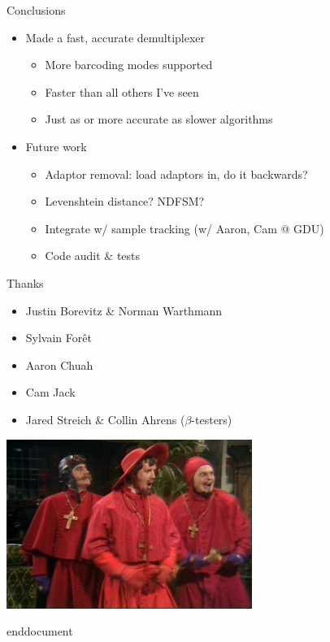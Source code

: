 \documentclass[t]{beamer}
\begin{document}
\begin{frame}{Conclusions}
  \begin{itemize}
    \item Made a fast, accurate demultiplexer
    \begin{itemize}
      \item More barcoding modes supported
      \item Faster than all others I've seen
      \item Just as or more accurate as slower algorithms
    \end{itemize}
    \item Future work
    \begin{itemize}
      \item Adaptor removal: load adaptors in, do it backwards?
      \item Levenshtein distance? NDFSM?
      \item Integrate w/ sample tracking (w/ Aaron, Cam @ GDU)
      \item Code audit \& tests
    \end{itemize}
  \end{itemize}
\end{frame}

\begin{frame}{Thanks}
  \begin{itemize}
    \item Justin Borevitz \& Norman Warthmann
    \item Sylvain For\^{e}t
    \item Aaron Chuah
    \item Cam Jack
    \item Jared Streich \& Collin Ahrens ($\beta$-testers)
  \end{itemize}
  \pause
  \begin{center}
    \includegraphics[width=0.6\textwidth]{img/spaninq.jpg}
  \end{center}
\end{frame}

end{document}
\end{document}
